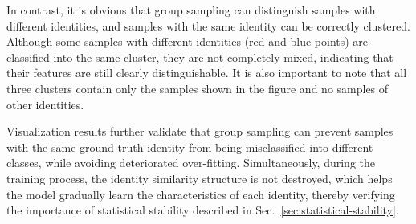 \documentclass[lettersize,journal]{IEEEtran}
\begin{document}
In contrast, it is obvious that group sampling can distinguish samples with different identities, and samples with the same identity can be correctly clustered. Although some samples with different identities (red and blue points) are classified into the same cluster, they are not completely mixed, indicating that their features are still clearly distinguishable. 
It is also important to note that all three clusters contain only the samples shown in the figure and no samples of other identities.

Visualization results further validate that group sampling can prevent samples with the same ground-truth identity from being misclassified into different classes, while avoiding deteriorated over-fitting. Simultaneously, during the training process, the identity similarity structure is not destroyed, which helps the model gradually learn the characteristics of each identity, thereby verifying the importance of statistical stability described in Sec.~\ref{sec:statistical-stability}.
\end{document}
